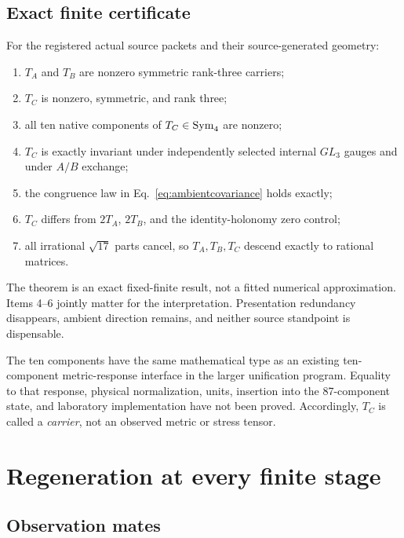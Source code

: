 \subsection{Exact finite certificate}

\begin{theorem}\label{thm:x60}
For the registered actual source packets and their source-generated geometry:
\begin{enumerate}
\item $T_A$ and $T_B$ are nonzero symmetric rank-three carriers;
\item $T_C$ is nonzero, symmetric, and rank three;
\item all ten native components of $T_C\in\operatorname{Sym}_4$ are nonzero;
\item $T_C$ is exactly invariant under independently selected internal $GL_3$ gauges and under $A/B$ exchange;
\item the congruence law in Eq.~\eqref{eq:ambientcovariance} holds exactly;
\item $T_C$ differs from $2T_A$, $2T_B$, and the identity-holonomy zero control;
\item all irrational $\sqrt{17}$ parts cancel, so $T_A,T_B,T_C$ descend exactly to rational matrices.
\end{enumerate}
\end{theorem}

The theorem is an exact fixed-finite result, not a fitted numerical approximation. Items 4--6 jointly matter for the interpretation. Presentation redundancy disappears, ambient direction remains, and neither source standpoint is dispensable.

The ten components have the same mathematical type as an existing ten-component metric-response interface in the larger unification program. Equality to that response, physical normalization, units, insertion into the 87-component state, and laboratory implementation have not been proved. Accordingly, $T_C$ is called a \emph{carrier}, not an observed metric or stress tensor.

\section{Regeneration at every finite stage}

\subsection{Observation mates}

